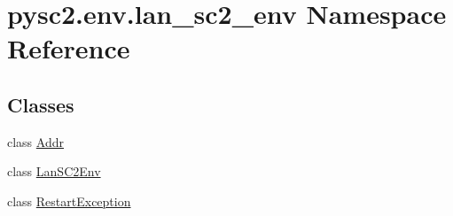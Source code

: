 \hypertarget{namespacepysc2_1_1env_1_1lan__sc2__env}{}\section{pysc2.\+env.\+lan\+\_\+sc2\+\_\+env Namespace Reference}
\label{namespacepysc2_1_1env_1_1lan__sc2__env}
\subsection*{Classes}
\begin{DoxyCompactItemize}
\item 
class \mbox{\hyperlink{classpysc2_1_1env_1_1lan__sc2__env_1_1_addr}{Addr}}
\item 
class \mbox{\hyperlink{classpysc2_1_1env_1_1lan__sc2__env_1_1_lan_s_c2_env}{Lan\+S\+C2\+Env}}
\item 
class \mbox{\hyperlink{classpysc2_1_1env_1_1lan__sc2__env_1_1_restart_exception}{Restart\+Exception}}
\end{DoxyCompactItemize}
